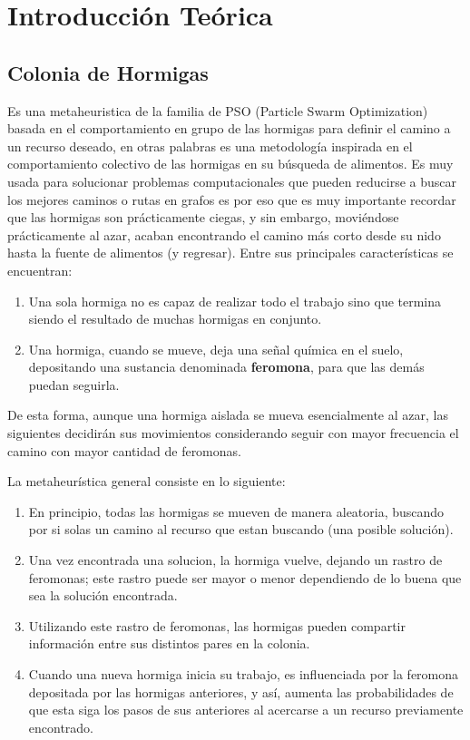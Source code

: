 \newpage
\section{Introducción Teórica}\label{sec:introduccion}
\subsection{Colonia de Hormigas}
Es una metaheuristica de la familia de PSO (Particle Swarm Optimization) basada en el comportamiento en grupo de las hormigas para definir el camino a un recurso deseado, en otras palabras es una metodología inspirada en el comportamiento colectivo de las hormigas en su búsqueda de alimentos. 
Es muy usada para solucionar problemas computacionales que pueden reducirse a buscar los mejores caminos o rutas en grafos es por eso que es muy importante recordar que las hormigas son prácticamente ciegas, y sin embargo, moviéndose prácticamente al azar, acaban encontrando el camino más corto desde su nido hasta la fuente de alimentos (y regresar).
Entre sus principales características se encuentran:

\begin{enumerate}
\item Una sola hormiga no es capaz de realizar todo el trabajo sino que termina siendo el resultado de muchas hormigas en conjunto.
\item Una hormiga, cuando se mueve, deja una señal química en el suelo, depositando una sustancia denominada \textbf{feromona}, para que las demás puedan seguirla.
\end{enumerate}

De esta forma, aunque una hormiga aislada se mueva esencialmente al azar, las siguientes decidirán sus movimientos considerando seguir con mayor frecuencia el camino con mayor cantidad de feromonas.

La metaheurística general consiste en lo siguiente:
\begin{enumerate}
\item En principio, todas las hormigas se mueven de manera aleatoria, buscando por si solas un camino al recurso que estan buscando (una posible solución).
\item Una vez encontrada una solucion, la hormiga vuelve, dejando un rastro de feromonas; este rastro puede ser mayor o menor dependiendo de lo buena que sea la solución encontrada. 
\item Utilizando este rastro de feromonas, las hormigas pueden compartir información entre sus distintos pares en la colonia.
\item Cuando una nueva hormiga inicia su trabajo, es influenciada por la feromona depositada por las hormigas anteriores, y así, aumenta las probabilidades de que esta siga los pasos de sus anteriores
al acercarse a un recurso previamente encontrado.
\end{enumerate}


